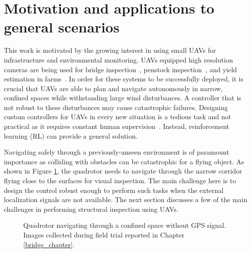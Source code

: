 \documentclass[12pt]{report}
\begin{document}
\section{Motivation and applications to general scenarios} 
This work is motivated by the growing interest in using small UAVs for infrastructure and environmental monitoring. UAVs equipped high resolution cameras are being used for bridge inspection~\cite{liu2014review}, penstock inspection~\cite{ozaslaninspection}, and yield estimation in farms~\cite{das2015devices}. In order for these systems to be successfully deployed, it is crucial that UAVs are able to plan and navigate autonomously in narrow, confined spaces while withstanding large wind disturbances. A controller that is not robust to these disturbances may cause catastrophic failures. Designing custom controllers for UAVs in every new situation is a tedious task and not practical as it requires constant human supervision~\cite{kober2012reinforcement}. Instead, reinforcement learning (RL) can provide a general solution.\par 
Navigating safely through a previously-unseen environment is of paramount importance as colliding with obstacles can be catastrophic for a flying object. As shown in Figure \ref{fig:motivation}, the quadrotor needs to navigate through the narrow corridor flying close to the surfaces for visual inspection. The main challenge here is to design the control robust enough to perform such tasks when the external localization signals are not available. The next section discusses a few of the main challenges in performing structural inspection using UAVs.

\begin{figure}[htp]
	\centering
	\caption {Quadrotor navigating through a confined space without GPS signal. Images collected during field trial reported in Chapter \ref{bridge_chapter}.}
   \label{fig:motivation}
\end{figure}
\end{document}
